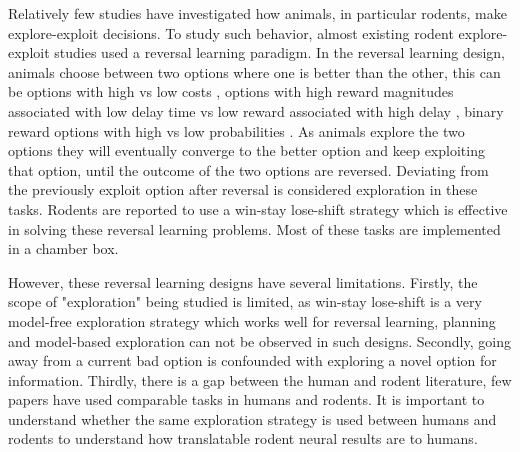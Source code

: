 \documentclass[12pt]{article}
\begin{document}
Relatively few studies have investigated how animals, in particular rodents, make explore-exploit decisions. To study such behavior, almost existing rodent explore-exploit studies used a reversal learning paradigm. In the reversal learning design, animals choose between two options where one is better than the other, this can be options with high vs low costs \citep{Beeler2010}, options with high reward magnitudes associated with low delay time vs low reward associated with high delay \citep{Laskowski2016}, binary reward options with high vs low probabilities  \citep{Parker2016, Cinotti2019, Verharen2020}. As animals explore the two options they will eventually converge to the better option and keep exploiting that option, until the outcome of the two options are reversed. Deviating from the previously exploit option after reversal is considered exploration in these tasks. Rodents are reported to use a win-stay lose-shift strategy which is effective in solving these reversal learning problems. Most of these tasks are implemented in a chamber box. 


However, these reversal learning designs have several limitations. Firstly, the scope of "exploration" being studied is limited, as win-stay lose-shift is a very model-free exploration strategy which works well for reversal learning, planning and model-based exploration can not be observed in such designs. Secondly, going away from a current bad option is confounded with exploring a novel option for information. Thirdly, there is a gap between the human and rodent literature, few papers have used comparable tasks in humans and rodents. It is important to understand whether the same exploration strategy is used between humans and rodents to understand how translatable rodent neural results are to humans.   %



\end{document}
